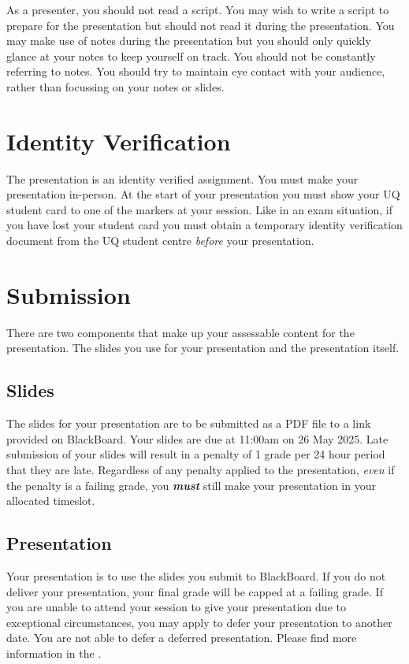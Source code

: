 \documentclass{csse4400}
\begin{document}
As a presenter, you should not read a script.
You may wish to write a script to prepare for the presentation but should not read it during the presentation.
You may make use of notes during the presentation but you should only quickly glance at your notes to keep yourself on track.
You should not be constantly referring to notes.
You should try to maintain eye contact with your audience, rather than focussing on your notes or slides.

\section{Identity Verification}
The presentation is an identity verified assignment.
You must make your presentation in-person.
At the start of your presentation you must show your UQ student card to one of the markers at your session.
Like in an exam situation, if you have lost your student card
you must obtain a temporary identity verification document from the UQ student centre \emph{before} your presentation.


\section{Submission}

There are two components that make up your assessable content for the presentation.
The slides you use for your presentation and the presentation itself.

\subsection{Slides}
The slides for your presentation are to be submitted as a PDF file to a link provided on BlackBoard.
Your slides are due at 11:00am on 26 May 2025.
Late submission of your slides will result in a penalty of 1 grade per 24 hour period that they are late.
Regardless of any penalty applied to the presentation, \emph{even} if the penalty is a failing grade,
you \textbf{\textit{must}} still make your presentation in your allocated timeslot.

\subsection{Presentation}
Your presentation is to use the slides you submit to BlackBoard.
If you do not deliver your presentation, your final grade will be capped at a failing grade.
If you are unable to attend your session to give your presentation due to exceptional circumstances,
you may apply to defer your presentation to another date.
You are not able to defer a deferred presentation.
Please find more information in the
.
\end{document}
